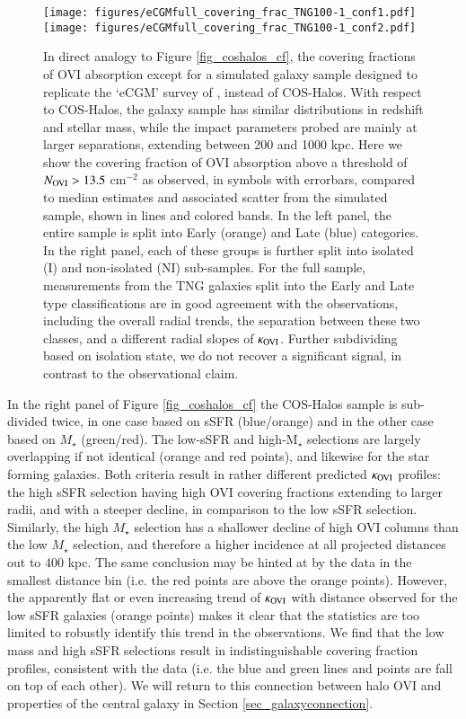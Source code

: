 \documentclass[useAMS,usenatbib]{mnras}
\newcommand{\ovi}{OVI\xspace}
\begin{document}
\begin{figure*}
\centering
\texttt{[image: figures/eCGMfull\_covering\_frac\_TNG100-1\_conf1.pdf]}
\texttt{[image: figures/eCGMfull\_covering\_frac\_TNG100-1\_conf2.pdf]}
\caption{ In direct analogy to Figure \ref{fig_coshalos_cf}, the covering fractions of \ovi absorption except for a simulated galaxy sample designed to replicate the `eCGM' survey of \protect\cite{johnson15a}, instead of COS-Halos. With respect to COS-Halos, the galaxy sample has similar distributions in redshift and stellar mass, while the impact parameters probed are mainly at larger separations, extending between 200 and 1000 kpc. Here we show the covering fraction of \ovi absorption above a threshold of $N_{\rm OVI} > 13.5$ cm$^{-2}$ as observed, in symbols with errorbars, compared to median estimates and associated scatter from the simulated sample, shown in lines and colored bands. In the left panel, the entire sample is split into Early (orange) and Late (blue) categories. In the right panel, each of these groups is further split into isolated (I) and non-isolated (NI) sub-samples. For the full sample, measurements from the TNG galaxies split into the Early and Late type classifications are in good agreement with the observations, including the overall radial trends, the separation between these two classes, and a different radial slopes of $\kappa_{\rm OVI}$. Further subdividing based on isolation state, we do not recover a significant signal, in contrast to the observational claim. 
 \label{fig_ecgm}}
\end{figure*}

In the right panel of Figure \ref{fig_coshalos_cf} the COS-Halos sample is sub-divided twice, in one case based on sSFR (blue/orange) and in the other case based on $M_\star$ (green/red). The low-sSFR and high-M$_\star$ selections are largely overlapping if not identical (orange and red points), and likewise for the star forming galaxies. Both criteria result in rather different predicted $\kappa_{\rm OVI}$ profiles: the high sSFR selection having high \ovi covering fractions extending to larger radii, and with a steeper decline, in comparison to the low sSFR selection. Similarly, the high $M_\star$ selection has a shallower decline of high \ovi columns than the low $M_\star$ selection, and therefore a higher incidence at all projected distances out to 400 kpc. The same conclusion may be hinted at by the data in the smallest distance bin (i.e. the red points are above the orange points). However, the apparently flat or even increasing trend of $\kappa_{\rm OVI}$ with distance observed for the low sSFR galaxies (orange points) makes it clear that the statistics are too limited to robustly identify this trend in the observations. We find that the low mass and high sSFR selections result in indistinguishable covering fraction profiles, consistent with the data (i.e. the blue and green lines and points are fall on top of each other). We will return to this connection between halo \ovi and properties of the central galaxy in Section \ref{sec_galaxyconnection}.
\end{document}
